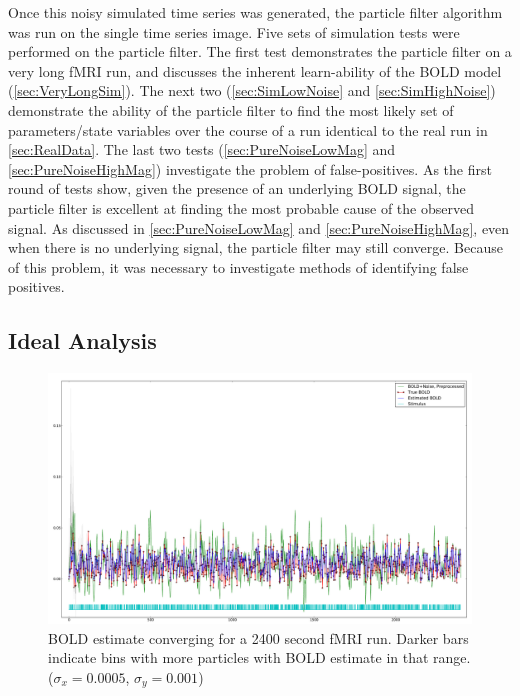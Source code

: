Once this noisy simulated time series was generated, the particle filter algorithm
was run on the single time series image. Five sets of simulation tests
were performed on the particle filter.
The first test demonstrates the particle filter on a very long \ac{fMRI}
run, and discusses the inherent learn-ability of the \ac{BOLD} model
(\autoref{sec:VeryLongSim}).
The next two (\autoref{sec:SimLowNoise} and \autoref{sec:SimHighNoise})
demonstrate the ability of the particle filter to find the most likely
set of parameters/state variables over the course of a run identical to the
real run in \autoref{sec:RealData}. The last two
tests (\autoref{sec:PureNoiseLowMag} and \autoref{sec:PureNoiseHighMag})
investigate the problem of false-positives. As the first
round of tests show, given the presence of an underlying \ac{BOLD} signal,
the particle filter is excellent at finding the most probable cause of
the observed signal. As discussed in \autoref{sec:PureNoiseLowMag} and
\autoref{sec:PureNoiseHighMag}, even when there is no underlying signal,
the particle filter may still converge. Because of this problem, it was
necessary to investigate methods of identifying false positives.

\subsection{Ideal Analysis}
\label{sec:VeryLongSim}

\begin{figure}
\centering
\includegraphics[clip=true,trim=1cm 0cm 0cm 0cm, width=17cm]{images/long_converge}
\caption[\ac{BOLD} estimate converging for a very long \ac{fMRI} run.]{\ac{BOLD} estimate 
converging for a 2400 second \ac{fMRI} run. Darker bars indicate
bins with more particles with \ac{BOLD} estimate in that range. ($\sigma_x = 0.0005$, $\sigma_y = 0.001$)}
\label{fig:long_converge}
\end{figure}

